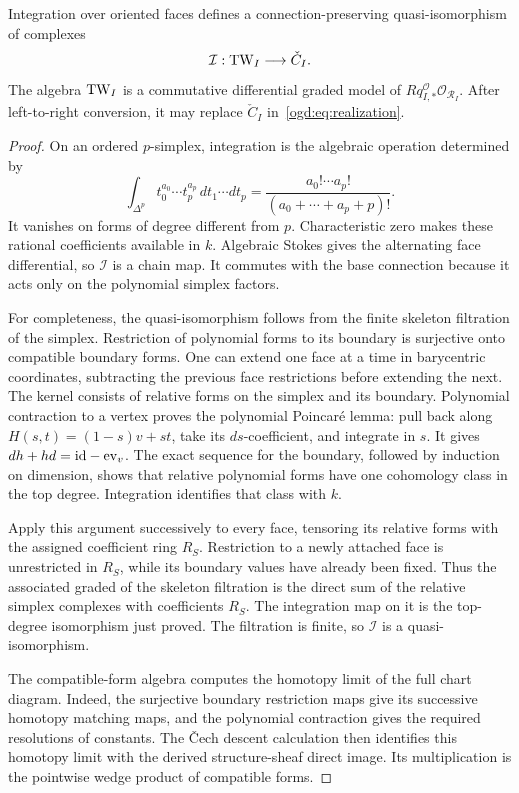 \begin{proposition}\label{ogd:prop:TW}
Integration over oriented faces defines a connection-preserving quasi-isomorphism of complexes
\[
 \mathcal I:\operatorname{TW}_I\longrightarrow \check C_I.
\]
The algebra \(\operatorname{TW}_I\) is a commutative differential graded model of \(Rq_{I,*}^{\mathcal O}\mathcal O_{\mathscr R_I}\).
After left-to-right conversion, it may replace \(\check C_I\) in~\eqref{ogd:eq:realization}.
\end{proposition}
\begin{proof}
On an ordered \(p\)-simplex, integration is the algebraic operation determined by
\[
 \int_{\Delta^p}t_0^{a_0}\cdots t_p^{a_p}\,dt_1\cdots dt_p
       =\frac{a_0!\cdots a_p!}{(a_0+\cdots+a_p+p)!}.
\]
It vanishes on forms of degree different from \(p\).
Characteristic zero makes these rational coefficients available in \(k\).
Algebraic Stokes gives the alternating face differential, so \(\mathcal I\) is a chain map.
It commutes with the base connection because it acts only on the polynomial simplex factors.

For completeness, the quasi-isomorphism follows from the finite skeleton filtration of the simplex.
Restriction of polynomial forms to its boundary is surjective onto compatible boundary forms.
One can extend one face at a time in barycentric coordinates, subtracting the previous face restrictions before extending the next.
The kernel consists of relative forms on the simplex and its boundary.
Polynomial contraction to a vertex proves the polynomial Poincar\'e lemma: pull back along \(H(s,t)=(1-s)v+st\), take its \(ds\)-coefficient, and integrate in \(s\).
It gives \(dh+hd=\mathrm{id}-\operatorname{ev}_v\).
The exact sequence for the boundary, followed by induction on dimension, shows that relative polynomial forms have one cohomology class in the top degree.
Integration identifies that class with \(k\).

Apply this argument successively to every face, tensoring its relative forms with the assigned coefficient ring \(R_S\).
Restriction to a newly attached face is unrestricted in \(R_S\), while its boundary values have already been fixed.
Thus the associated graded of the skeleton filtration is the direct sum of the relative simplex complexes with coefficients \(R_S\).
The integration map on it is the top-degree isomorphism just proved.
The filtration is finite, so \(\mathcal I\) is a quasi-isomorphism.

The compatible-form algebra computes the homotopy limit of the full chart diagram.
Indeed, the surjective boundary restriction maps give its successive homotopy matching maps, and the polynomial contraction gives the required resolutions of constants.
The \v{C}ech descent calculation then identifies this homotopy limit with the derived structure-sheaf direct image.
Its multiplication is the pointwise wedge product of compatible forms.
\end{proof}

